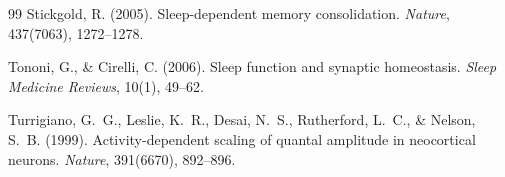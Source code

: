 \documentclass[12pt, a4paper]{article}
\begin{document}
\begin{thebibliography}{99}
Stickgold, R. (2005).
Sleep-dependent memory consolidation.
\textit{Nature}, 437(7063), 1272--1278.

Tononi, G., \& Cirelli, C. (2006).
Sleep function and synaptic homeostasis.
\textit{Sleep Medicine Reviews}, 10(1), 49--62.

Turrigiano, G.~G., Leslie, K.~R., Desai, N.~S., Rutherford, L.~C., \& Nelson, S.~B.
(1999).
Activity-dependent scaling of quantal amplitude in neocortical neurons.
\textit{Nature}, 391(6670), 892--896.

\end{thebibliography}
\end{document}
